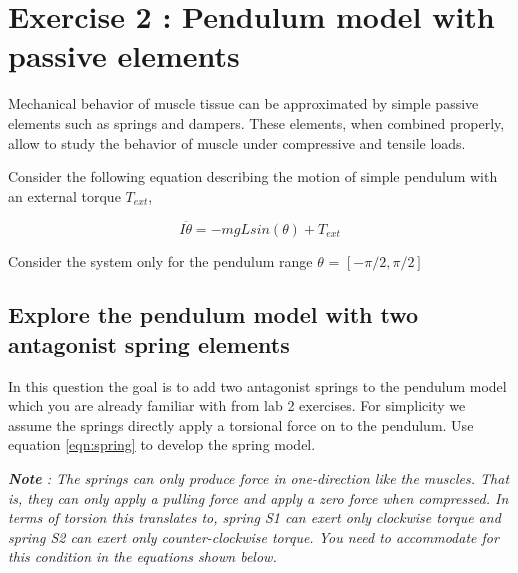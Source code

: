 \documentclass{cmc}
\begin{document}







\section*{Exercise 2 : Pendulum model with passive elements}
\label{sec:question-1}

Mechanical behavior of muscle tissue can be approximated by simple
passive elements such as springs and dampers. These elements, when
combined properly, allow to study the behavior of muscle under
compressive and tensile loads.

Consider the following equation describing the motion of simple
pendulum with an external torque $T_{ext}$,

\begin{equation}
  \label{eq:pendulum_1}
  I\ddot{\theta} = -mgLsin(\theta) + T_{ext}
\end{equation}


Consider the system only for the pendulum range $\theta$ =
$[-\pi/2, \pi/2]$

\subsection*{Explore the pendulum model with two antagonist spring
  elements}

In this question the goal is to add two antagonist springs to the
pendulum model which you are already familiar with from lab 2
exercises. For simplicity we assume the springs directly apply a
torsional force on to the pendulum.  Use equation \ref{eqn:spring} to
develop the spring model.

\textit{\textbf{Note} : The springs can only produce force in
  one-direction like the muscles.  That is, they can only apply a
  pulling force and apply a zero force when compressed.  In terms of
  torsion this translates to, spring S1 can exert only clockwise
  torque and spring S2 can exert only counter-clockwise torque.  You
  need to accommodate for this condition in the equations shown below.}
\end{document}
